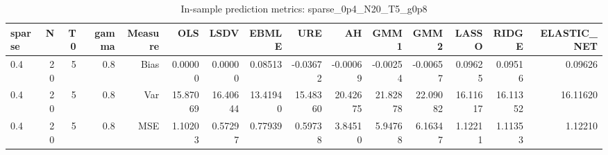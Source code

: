 \begin{table}[!htbp]\centering
\caption{In-sample prediction metrics: sparse_0p4_N20_T5_g0p8}
\label{tab:table2_sparse_0p4_N20_T5_g0p8}
\begin{tabular}{lrrrrrrrrrrrrrr}
\hline
sparse & N & T0 & gamma & Measure & OLS & LSDV & EBMLE & URE & AH & GMM1 & GMM2 & LASSO & RIDGE & ELASTIC_NET \\
\hline
0.4 & 20 & 5 & 0.8 & Bias & 0.00000 & 0.00000 & 0.08513 & -0.03672 & -0.00069 & -0.00254 & -0.00657 & 0.09625 & 0.09516 & 0.09626 \\
0.4 & 20 & 5 & 0.8 & Var & 15.87069 & 16.40644 & 13.41940 & 15.48360 & 20.42675 & 21.82878 & 22.09082 & 16.11617 & 16.11352 & 16.11620 \\
0.4 & 20 & 5 & 0.8 & MSE & 1.10203 & 0.57297 & 0.77939 & 0.59738 & 3.84510 & 5.94768 & 6.16347 & 1.12211 & 1.11353 & 1.12210 \\
\hline
\end{tabular}
\end{table}


